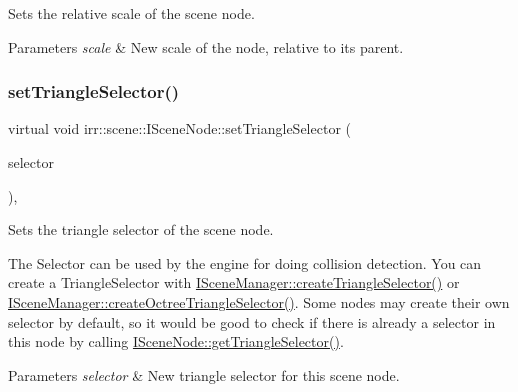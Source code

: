 Sets the relative scale of the scene node. 


\begin{DoxyParams}{Parameters}
{\em scale} & New scale of the node, relative to its parent. \\
\hline
\end{DoxyParams}
\mbox{\label{classirr_1_1scene_1_1ISceneNode_a87fb52ec54bf3ae117340d8defd1255f}} 
\subsubsection{\texorpdfstring{set\+Triangle\+Selector()}{setTriangleSelector()}\hspace{0.1cm}{\footnotesize\ttfamily [1/2]}}
{\footnotesize\ttfamily virtual void irr\+::scene\+::\+I\+Scene\+Node\+::set\+Triangle\+Selector (\begin{DoxyParamCaption}\item[{\hyperlink{classirr_1_1scene_1_1ITriangleSelector}{I\+Triangle\+Selector} $\ast$}]{selector }\end{DoxyParamCaption})\hspace{0.3cm}{\ttfamily [inline]}, {\ttfamily [virtual]}}



Sets the triangle selector of the scene node. 

The Selector can be used by the engine for doing collision detection. You can create a Triangle\+Selector with \hyperlink{classirr_1_1scene_1_1ISceneManager_a266625379b1558e9be1dc062ea4e71f7}{I\+Scene\+Manager\+::create\+Triangle\+Selector()} or \hyperlink{classirr_1_1scene_1_1ISceneManager_a4ed7d3b34f4d0c70395b6d464fe32b96}{I\+Scene\+Manager\+::create\+Octree\+Triangle\+Selector()}. Some nodes may create their own selector by default, so it would be good to check if there is already a selector in this node by calling \hyperlink{classirr_1_1scene_1_1ISceneNode_ab820f7ccfdd317d3913316b6991ea5d9}{I\+Scene\+Node\+::get\+Triangle\+Selector()}. 
\begin{DoxyParams}{Parameters}
{\em selector} & New triangle selector for this scene node. \\
\hline
\end{DoxyParams}
\mbox{\label{classirr_1_1scene_1_1ISceneNode_a87fb52ec54bf3ae117340d8defd1255f}} 

